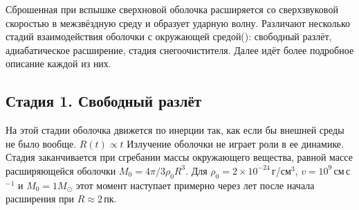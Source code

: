 \documentclass[a4paper,12pt]{extarticle}
\begin{document}
Сброшенная при вспышке сверхновой оболочка расширяется со сверхзвуковой скоростью в межзвёздную среду и образует ударную волну. 
Различают несколько стадий взаимодействия оболочки с окружающей средой({\cite{Spitzer1981}}): свободный разлёт, адиабатическое расширение, стадия снегоочистителя. Далее идёт более подробное описание каждой из них.

\subsection{Стадия 1. Свободный разлёт}
На этой стадии оболочка движется по инерции так, как если бы внешней среды не было вообще. $R(t)\propto t $ 
Излучение оболочки не играет роли в ее динамике. Стадия заканчивается при сгребании массы окружающего вещества, равной массе расширяющейся оболочки $M_0 = 4\pi/3\rho_0R^3$. 
Для $\rho_0=2\times10^{-24}$\,г/см$^3$, $v=10^9$\,см\,с$^{-1}$ и $M_0=1M_{\odot}$ этот момент наступает примерно через   лет после начала расширения при $R\approx 2$\,пк.
\end{document}

